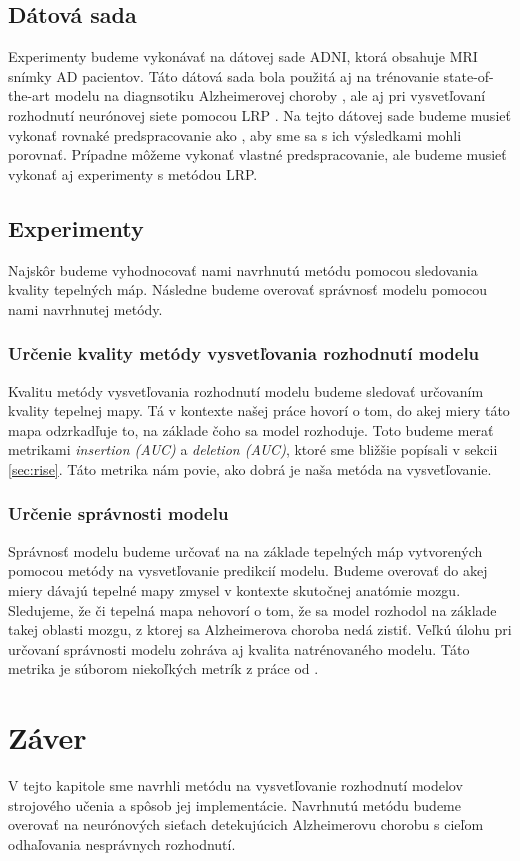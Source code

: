 \subsection{Dátová sada} Experimenty budeme vykonávať na dátovej sade ADNI, ktorá obsahuje MRI snímky AD pacientov. Táto dátová sada bola použitá aj na trénovanie state-of-the-art modelu na diagnsotiku Alzheimerovej choroby \cite{esmaeilzadeh2018end}, ale aj pri vysvetľovaní rozhodnutí neurónovej siete pomocou LRP \cite{bohle2019layer}. Na tejto dátovej sade budeme musieť vykonať rovnaké predspracovanie ako \citeauthor*{bohle2019layer}, aby sme sa s ich výsledkami mohli porovnať. Prípadne môžeme vykonať vlastné predspracovanie, ale budeme musieť vykonať aj experimenty s metódou LRP.

\subsection{Experimenty}

Najskôr budeme vyhodnocovať nami navrhnutú metódu pomocou sledovania kvality tepelných máp. Následne budeme overovať správnosť modelu pomocou nami navrhnutej metódy.

\subsubsection{Určenie kvality metódy vysvetľovania rozhodnutí modelu}

Kvalitu metódy vysvetľovania rozhodnutí modelu budeme sledovať určovaním kvality tepelnej mapy. Tá v kontexte našej práce hovorí o tom, do akej miery táto mapa odzrkadľuje to, na základe čoho sa model rozhoduje. Toto budeme merať metrikami \textit{insertion (AUC)} a \textit{deletion (AUC)}, ktoré sme bližšie popísali v sekcii \ref{sec:rise}. Táto metrika nám povie, ako dobrá je naša metóda na vysvetľovanie.

\subsubsection{Určenie správnosti modelu}

Správnosť modelu budeme určovať na na základe tepelných máp vytvorených pomocou metódy na vysvetľovanie predikcií modelu. Budeme overovať do akej miery dávajú tepelné mapy zmysel v kontexte skutočnej anatómie mozgu. Sledujeme, že či tepelná mapa nehovorí o tom, že sa model rozhodol na základe takej oblasti mozgu, z ktorej sa Alzheimerova choroba nedá zistiť. Veľkú úlohu pri určovaní správnosti modelu zohráva aj kvalita natrénovaného modelu. Táto metrika je súborom niekoľkých metrík z práce od \citeauthor*{bohle2019layer}.


\section{Záver}

V tejto kapitole sme navrhli metódu na vysvetľovanie rozhodnutí modelov strojového učenia a spôsob jej implementácie. Navrhnutú metódu budeme overovať na neurónových sieťach detekujúcich Alzheimerovu chorobu s cieľom odhaľovania nesprávnych rozhodnutí.
